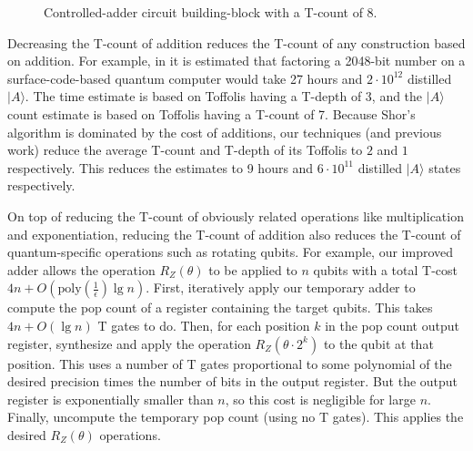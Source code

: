 \documentclass{quantumarticle-customized}
\begin{document}
\begin{figure}
  \caption{
	Controlled-adder circuit building-block with a T-count of 8.
  }
  \label{fig:controlled-full-adder-block}
\end{figure}

Decreasing the T-count of addition reduces the T-count of any construction based on addition.
For example, in \citep{Fowler2012} it is estimated that factoring a 2048-bit number on a surface-code-based quantum computer would take 27 hours and $2 \cdot 10^{12}$ distilled $|A\rangle$.
The time estimate is based on Toffolis having a T-depth of 3, and the $|A\rangle$ count estimate is based on Toffolis having a T-count of 7.
Because Shor's algorithm is dominated by the cost of additions, our techniques (and previous work) reduce the average T-count and T-depth of its Toffolis to $2$ and $1$ respectively.
This reduces the estimates to 9 hours and $6 \cdot 10^{11}$ distilled $|A\rangle$ states respectively.

On top of reducing the T-count of obviously related operations like multiplication and exponentiation, reducing the T-count of addition also reduces the T-count of quantum-specific operations such as rotating qubits.
For example, our improved adder allows the operation $R_Z(\theta)$ to be applied to $n$ qubits with a total T-cost $4n + O(\text{poly}(\frac{1}{\epsilon}) \lg n)$.
First, iteratively apply our temporary adder to compute the pop count of a register containing the target qubits.
This takes $4n + O(\lg n)$ T gates to do.
Then, for each position $k$ in the pop count output register, synthesize and apply the operation $R_Z(\theta \cdot 2^k)$ to the qubit at that position.
This uses a number of T gates proportional to some polynomial of the desired precision times the number of bits in the output register.
But the output register is exponentially smaller than $n$, so this cost is negligible for large $n$.
Finally, uncompute the temporary pop count (using no T gates).
This applies the desired $R_Z(\theta)$ operations.
\end{document}
